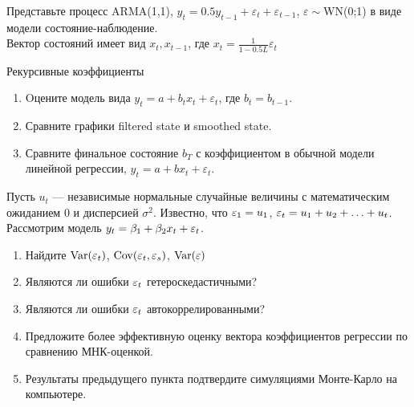 \documentclass[pdftex,11pt,openany]{book}\usepackage[]{graphicx}\usepackage[]{color}
\begin{document}
\begin{solution}
\end{solution}

\begin{problem}
Представьте процесс ARMA(1,1),
$y_{t}=0.5y_{t-1}+\varepsilon_{t}+\varepsilon_{t-1}$,
$\varepsilon\sim$WN(0;1) в
виде модели состояние-наблюдение. \\
Вектор состояний имеет вид $x_{t},x_{t-1}$, где
$x_{t}=\frac{1}{1-0.5L}\varepsilon_{t}$ 
\end{problem}

\begin{solution}
\end{solution}


\begin{problem}
Рекурсивные коэффициенты 
\begin{enumerate}
\item Oцените модель вида $y_{t}=a+b_{t}x_{t}+\varepsilon_{t}$,
где $b_{t}=b_{t-1}$. 
\item Сравните графики filtered state и smoothed state. 
\item Сравните финальное состояние $b_{T}$ с коэффициентом в
обычной модели линейной регрессии, $y_{t}=a+bx_{t}+\varepsilon_{t}$. 
\end{enumerate}
\end{problem}

\begin{solution}
\end{solution}


\begin{problem}
Пусть $u_t$ --- независимые нормальные случайные величины с 
математическим ожиданием $0$ и дисперсией $\sigma^2$. Известно, что $\varepsilon_1=u_1$, $\varepsilon_t=u_1+u_2+\ldots+u_t$. Рассмотрим модель $y_t=\beta_1+\beta_2 x_t + \varepsilon_t$.

\begin{enumerate}
\item Найдите $\operatorname{Var}(\varepsilon_t)$, $\operatorname{Cov}(\varepsilon_t,\varepsilon_s)$, $\operatorname{Var}(\varepsilon)$
\item Являются ли ошибки $\varepsilon_t$ гетероскедастичными?
\item Являются ли ошибки $\varepsilon_t$ автокоррелированными?
\item Предложите более эффективную оценку вектора коэффициентов регрессии по сравнению МНК-оценкой.
\item Результаты предыдущего пункта подтвердите симуляциями Монте-Карло на компьютере.
\end{enumerate}
\end{problem}
\end{document}
